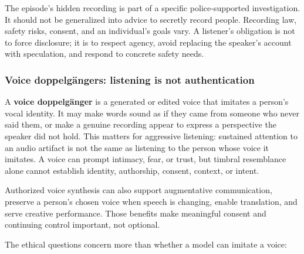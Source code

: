 \documentclass[
  11pt,
  letterpaper,
]{article}
\begin{document}
The episode's hidden recording is part of a specific police-supported
investigation. It should not be generalized into advice to secretly
record people. Recording law, safety risks, consent, and an individual's
goals vary. A listener's obligation is not to force disclosure; it is to
respect agency, avoid replacing the speaker's account with speculation,
and respond to concrete safety needs.

\subsubsection{Voice doppelgängers: listening is not
authentication}\label{voice-doppelguxe4ngers-listening-is-not-authentication}

A \textbf{voice doppelgänger} is a generated or edited voice that
imitates a person's vocal identity. It may make words sound as if they
came from someone who never said them, or make a genuine recording
appear to express a perspective the speaker did not hold. This matters
for aggressive listening: sustained attention to an audio artifact is
not the same as listening to the person whose voice it imitates. A voice
can prompt intimacy, fear, or trust, but timbral resemblance alone
cannot establish identity, authorship, consent, context, or intent.

Authorized voice synthesis can also support augmentative communication,
preserve a person's chosen voice when speech is changing, enable
translation, and serve creative performance. Those benefits make
meaningful consent and continuing control important, not optional.

The ethical questions concern more than whether a model can imitate a
voice:
\end{document}
